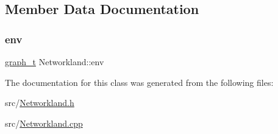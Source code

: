 \subsection{Member Data Documentation}
\mbox{\label{classNetworkland_abea776c7ff7c40e160371b260967e2c7}} 
\subsubsection{\texorpdfstring{env}{env}}
{\footnotesize\ttfamily \hyperlink{Networkland_8h_a15c13903d8f520e4339ca612a1ee2652}{graph\+\_\+t} Networkland\+::env\hspace{0.3cm}{\ttfamily [private]}}



The documentation for this class was generated from the following files\+:\begin{DoxyCompactItemize}
\item 
src/\hyperlink{Networkland_8h}{Networkland.\+h}\item 
src/\hyperlink{Networkland_8cpp}{Networkland.\+cpp}\end{DoxyCompactItemize}
